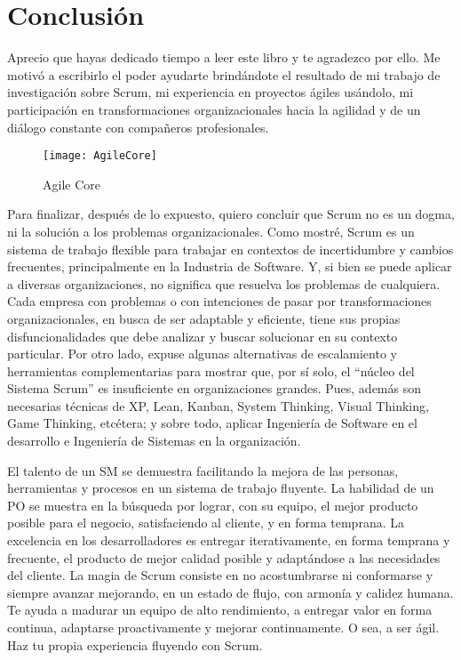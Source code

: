\chapter{Conclusión}

Aprecio que hayas dedicado tiempo a leer este libro y te agradezco por ello. Me motivó a escribirlo el poder ayudarte brindándote el resultado de mi trabajo de investigación sobre Scrum, mi experiencia en proyectos ágiles usándolo, mi participación en transformaciones organizacionales hacia la agilidad y de un diálogo constante con compañeros profesionales. 

\begin{figure}[h]
  \centering
  \texttt{[image: AgileCore]}
  \caption{Agile Core}
  \centering
  \label{fig:AgileCore} %
\end{figure}
\FloatBarrier %


Para finalizar, después de lo expuesto, quiero concluir que Scrum no es un dogma, ni la solución a los problemas organizacionales. Como mostré, Scrum es un sistema de trabajo flexible para trabajar en contextos de incertidumbre y cambios frecuentes, principalmente en la Industria de Software. Y, si bien se puede aplicar a diversas organizaciones, no significa que resuelva los problemas de cualquiera. Cada empresa con problemas o con intenciones de pasar por transformaciones organizacionales, en busca de ser adaptable y eficiente, tiene sus propias disfuncionalidades que debe analizar y buscar solucionar en su contexto particular. Por otro lado, expuse algunas alternativas de escalamiento y herramientas complementarias para mostrar que, por sí solo, el “núcleo del Sistema Scrum” es insuficiente en organizaciones grandes. Pues, además son necesarias técnicas de XP, Lean, Kanban, System Thinking, Visual Thinking, Game Thinking, etcétera; y sobre todo, aplicar Ingeniería de Software en el desarrollo e Ingeniería de Sistemas en la organización.


El talento de un SM se demuestra facilitando la mejora de las personas, herramientas y procesos en un sistema de trabajo fluyente. La habilidad de un PO se muestra en la búsqueda por lograr, con su equipo, el mejor producto posible para el negocio, satisfaciendo al cliente, y en forma temprana. La excelencia en los desarrolladores es entregar iterativamente, en forma temprana y frecuente, el producto de mejor calidad posible y adaptándose a las necesidades del cliente. La magia de Scrum consiste en no acostumbrarse ni conformarse y siempre avanzar mejorando, en un estado de flujo, con armonía y calidez humana. Te ayuda a madurar un equipo de alto rendimiento, a entregar valor en forma continua, adaptarse proactivamente y mejorar continuamente. O sea, a ser ágil. Haz tu propia experiencia fluyendo con Scrum.

